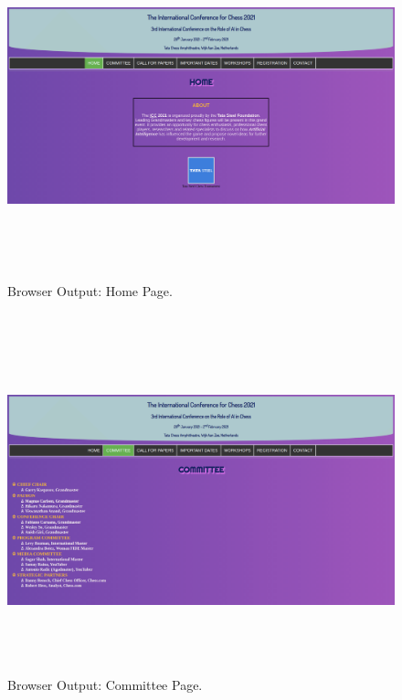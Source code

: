 \documentclass[12pt, a4]{article}
\begin{document}
\subsection*{}
\begin{figure}[h]
\centering
\caption{Browser Output: Home Page.}
\includegraphics[height=10cm, width=18cm, keepaspectratio]{Output/Home.png}
\end{figure}

\newpage
\subsection*{}
\begin{figure}[h]
\centering
\caption{Browser Output: Committee Page.}
\includegraphics[height=10cm, width=18cm, keepaspectratio]{Output/Committee.png}
\end{figure}
\end{document}
